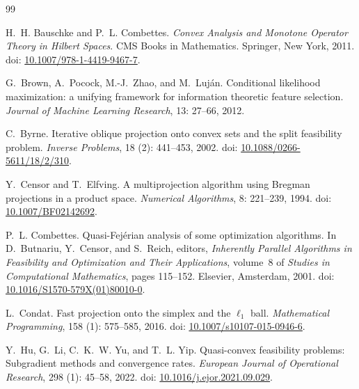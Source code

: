 \begin{thebibliography}{99}
\newcommand{\bibdoi}[1]{doi: {\urlstyle{rm}\url{#1}}}

H.~H. Bauschke and P.~L. Combettes.
\newblock \emph{Convex Analysis and Monotone Operator Theory in {H}ilbert Spaces}.
\newblock CMS Books in Mathematics. Springer, New York, 2011.
\newblock \bibdoi{10.1007/978-1-4419-9467-7}.

G.~Brown, A.~Pocock, M.-J.~Zhao, and M.~Luj{\'a}n.
\newblock Conditional likelihood maximization: a unifying framework for information theoretic feature selection.
\newblock \emph{Journal of Machine Learning Research}, 13: 27--66, 2012.

C.~Byrne.
\newblock Iterative oblique projection onto convex sets and the split feasibility problem.
\newblock \emph{Inverse Problems}, 18 (2): 441--453, 2002.
\newblock \bibdoi{10.1088/0266-5611/18/2/310}.

Y.~Censor and T.~Elfving.
\newblock A multiprojection algorithm using {B}regman projections in a product space.
\newblock \emph{Numerical Algorithms}, 8: 221--239, 1994.
\newblock \bibdoi{10.1007/BF02142692}.

P.~L. Combettes.
\newblock Quasi-Fej{\'e}rian analysis of some optimization algorithms.
\newblock In D.~Butnariu, Y.~Censor, and S.~Reich, editors, \emph{Inherently Parallel Algorithms in Feasibility and Optimization and Their Applications}, volume~8 of \emph{Studies in Computational Mathematics}, pages 115--152. Elsevier, Amsterdam, 2001.
\newblock \bibdoi{10.1016/S1570-579X(01)80010-0}.

L.~Condat.
\newblock Fast projection onto the simplex and the $\ell_1$ ball.
\newblock \emph{Mathematical Programming}, 158 (1): 575--585, 2016.
\newblock \bibdoi{10.1007/s10107-015-0946-6}.

Y.~Hu, G.~Li, C.~K.~W. Yu, and T.~L. Yip.
\newblock Quasi-convex feasibility problems: Subgradient methods and convergence rates.
\newblock \emph{European Journal of Operational Research}, 298 (1): 45--58, 2022.
\newblock \bibdoi{10.1016/j.ejor.2021.09.029}.


\end{thebibliography}
